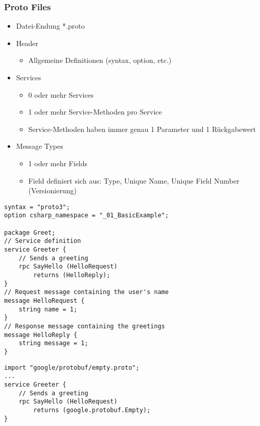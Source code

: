 \begin{multicols*}{2}
\subsubsection{Proto Files}    
\begin{itemize}
    \item Datei-Endung *.proto
    \item Header
    \begin{itemize}
        \item Allgemeine Definitionen (syntax, option, etc.)
    \end{itemize}
    \item Services
    \begin{itemize}
        \item 0 oder mehr Services
        \item 1 oder mehr Service-Methoden pro Service
        \item Service-Methoden haben immer genau 1 Parameter und 1 Rückgabewert
    \end{itemize}
    \item Message Types
    \begin{itemize}
        \item 1 oder mehr Fields
        \item Field definiert sich aus: Type, Unique Name, Unique Field Number (Versionierung)
    \end{itemize}
\end{itemize}
\begin{lstlisting}
syntax = "proto3";
option csharp_namespace = "_01_BasicExample"; 

package Greet;
// Service definition
service Greeter {
    // Sends a greeting
    rpc SayHello (HelloRequest)
        returns (HelloReply);
}
// Request message containing the user's name
message HelloRequest {
    string name = 1;
}
// Response message containing the greetings
message HelloReply {
    string message = 1;
}
\end{lstlisting}
\begin{lstlisting}
import "google/protobuf/empty.proto";
...
service Greeter {
    // Sends a greeting
    rpc SayHello (HelloRequest)
        returns (google.protobuf.Empty);
}
\end{lstlisting}

\end{multicols*}
